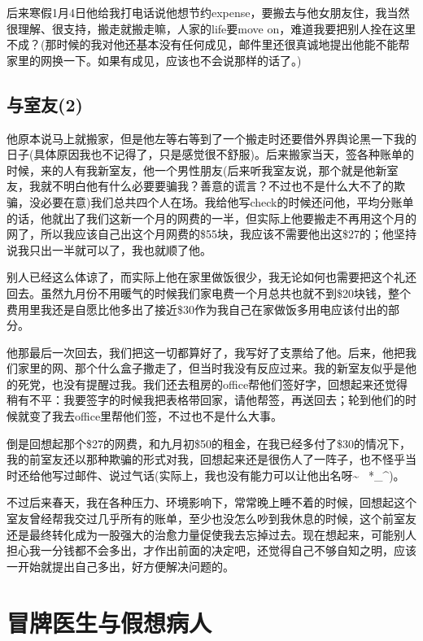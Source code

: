 \documentclass[12pt]{book}
\begin{document}
后来寒假1月4日他给我打电话说他想节约expense，要搬去与他女朋友住，我当然很理解、很支持，搬走就搬走嘛，人家的life要move on，难道我要把别人拴在这里不成？(那时候的我对他还基本没有任何成见，邮件里还很真诚地提出他能不能帮家里的网换一下。如果有成见，应该也不会说那样的话了。)

\section{与室友(2)}
\label{sec-17-2}

他原本说马上就搬家，但是他左等右等到了一个搬走时还要借外界舆论黑一下我的日子(具体原因我也不记得了，只是感觉很不舒服)。后来搬家当天，签各种账单的时候，来的人有我新室友，他一个男性朋友(后来听我室友说，那个就是他新室友，我就不明白他有什么必要要骗我？善意的谎言？不过也不是什么大不了的欺骗，没必要在意)我们总共四个人在场。我给他写check的时候还问他，平均分账单的话，他就出了我们这新一个月的网费的一半，但实际上他要搬走不再用这个月的网了，所以我应该自己出这个月网费的\$55块，我应该不需要他出这\$27的；他坚持说我只出一半就可以了，我也就顺了他。

别人已经这么体谅了，而实际上他在家里做饭很少，我无论如何也需要把这个礼还回去。虽然九月份不用暖气的时候我们家电费一个月总共也就不到\$20块钱，整个费用里我还是自愿比他多出了接近\$30作为我自己在家做饭多用电应该付出的部分。

他那最后一次回去，我们把这一切都算好了，我写好了支票给了他。后来，他把我们家里的网、那个什么盒子撒走了，但当时我没有反应过来。我的新室友似乎是他的死党，也没有提醒过我。我们还去租房的office帮他们签好字，回想起来还觉得稍有不平：我要签字的时候我把表格带回家，请他帮签，再送回去；轮到他们的时候就变了我去office里帮他们签，不过也不是什么大事。

倒是回想起那个\$27的网费，和九月初\$50的租金，在我已经多付了\$30的情况下，我的前室友还以那种欺骗的形式对我，回想起来还是很伤人了一阵子，也不怪乎当时还给他写过邮件、说过气话(实际上，我也没有能力可以让他出名呀\textasciitilde{}~ *\_\^{})。

不过后来春天，我在各种压力、环境影响下，常常晚上睡不着的时候，回想起这个室友曾经帮我交过几乎所有的账单，至少也没怎么吵到我休息的时候，这个前室友还是最终转化成为一股强大的治愈力量促使我去忘掉过去。现在想起来，可能别人担心我一分钱都不会多出，才作出前面的决定吧，还觉得自己不够自知之明，应该一开始就提出自己多出，好方便解决问题的。

\chapter{冒牌医生与假想病人}
\label{sec-18}
\end{document}
